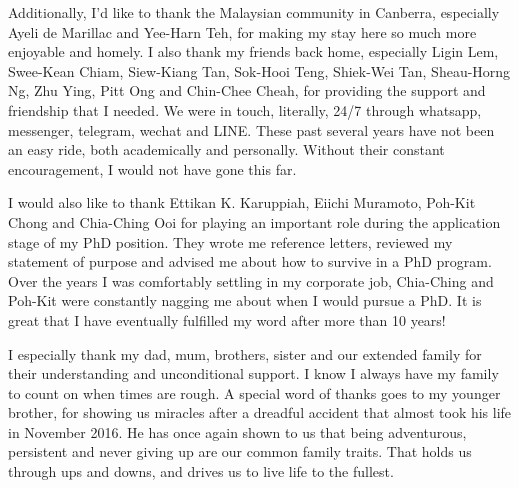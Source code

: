 Additionally, I'd like to thank the Malaysian community in Canberra, especially Ayeli de Marillac and Yee-Harn Teh, for making my stay here so much more enjoyable and homely. I also thank my friends back home, especially Ligin Lem, Swee-Kean Chiam, Siew-Kiang Tan, Sok-Hooi Teng, Shiek-Wei Tan, Sheau-Horng Ng, Zhu Ying, Pitt Ong and Chin-Chee Cheah, for providing the support and friendship that I needed. We were in touch, literally, 24/7 through whatsapp, messenger, telegram, wechat and LINE. These past several years have not been an easy ride, both academically and personally. Without their constant encouragement, I would not have gone this far.  

I would also like to thank Ettikan K. Karuppiah, Eiichi Muramoto, Poh-Kit Chong and Chia-Ching Ooi for playing an important role during the application stage of my PhD position. They wrote me reference letters, reviewed my statement of purpose and advised me about how to survive in a PhD program. Over the years I was comfortably settling in my corporate job, Chia-Ching and Poh-Kit were constantly nagging me about when I would pursue a PhD. It is great that I have eventually fulfilled my word after more than 10 years!

I especially thank my dad, mum, brothers, sister and our extended family for their understanding and unconditional support.
I know I always have my family to count on when times are rough. 
A special word of thanks goes to my younger brother, for showing us miracles after a dreadful accident that almost took his life in November 2016. 
He has once again shown to us that being adventurous, persistent and never giving up are our common family traits. 
That holds us through ups and downs, and drives us to live life to the fullest. 
